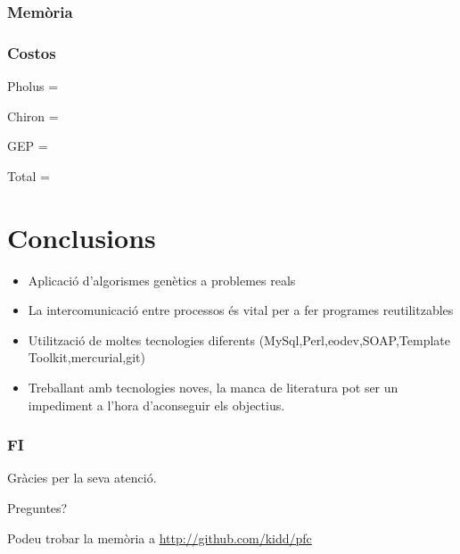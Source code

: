 \documentclass{beamer}
\begin{document}
\begin{frame}
	\frametitle{Memòria}
\end{frame}

\begin{frame}
	\frametitle{Costos}
	Pholus =  

	Chiron =  

	GEP  =  

	Total = 
\end{frame}


\section{Conclusions} %
\label{sec:Conclusions}

\begin{frame}
	\begin{itemize}
		\item Aplicació d'algorismes genètics a problemes reals
		\item La intercomunicació entre processos és vital per a fer programes reutilitzables
		\item Utilització de moltes tecnologies diferents (MySql,Perl,eodev,SOAP,Template
			Toolkit,mercurial,git)
		\item Treballant amb tecnologies noves, la manca de literatura pot ser un impediment a
			l'hora d'aconseguir els objectius.
	\end{itemize}
\end{frame}

\begin{frame}
	\frametitle{FI}
	Gràcies per la seva atenció.

	Preguntes?

	\begin{center}
	\end{center}

	Podeu trobar la memòria a \url{http://github.com/kidd/pfc}

\end{frame}

\end{document}
